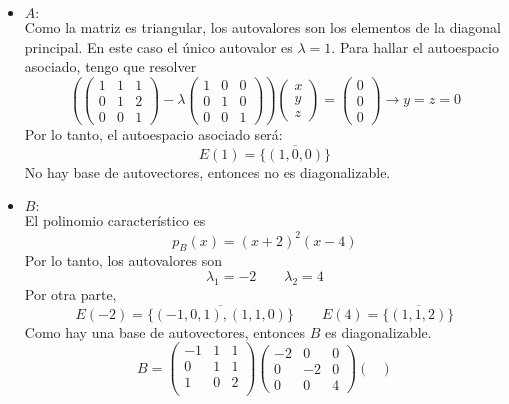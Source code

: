     \begin{mdframed}[style=s]
        \begin{itemize}
            \item $A:$\\
                Como la matriz es triangular, los autovalores son los elementos de la diagonal principal. En este caso el único autovalor es $\lambda=1$. Para hallar el autoespacio asociado, tengo que resolver\[\left(\begin{pmatrix}
                    1&1&1\\0&1&2\\0&0&1
                \end{pmatrix}-\lambda\begin{pmatrix}
                    1&0&0\\0&1&0\\0&0&1
                \end{pmatrix}\right)\begin{pmatrix}
                    x\\y\\z
                \end{pmatrix}=\begin{pmatrix}
                    0\\0\\0
                \end{pmatrix}\to y=z=0\]
                Por lo tanto, el autoespacio asociado será: \[E(1)=\overline{\{(1,0,0)\}}\]
                No hay base de autovectores, entonces no es diagonalizable.
            \item $B:$\\
                El polinomio característico es\[p_B(x)=(x+2)^2(x-4)\]
                Por lo tanto, los autovalores son\[\lambda_1=-2\qquad\lambda_2=4\]
                Por otra parte, \[E(-2)=\overline{\{(-1,0,1),(1,1,0)\}}\qquad E(4)=\overline{\{(1,1,2)\}}\]
                Como hay una base de autovectores, entonces $B$ es diagonalizable.
                \[B=\begin{pmatrix}
                    -1&1&1\\
                    0 &1&1\\
                    1 &0&2\\
                \end{pmatrix}\begin{pmatrix}
                    -2&0&0\\0&-2&0\\0&0&4
                \end{pmatrix}\begin{pmatrix}

\end{pmatrix}\]
\end{itemize}
\end{mdframed}
